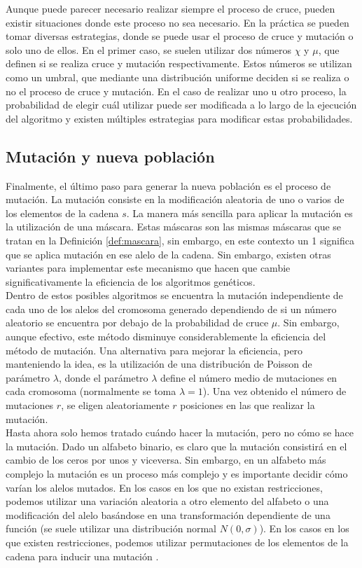 Aunque puede parecer necesario realizar siempre el proceso de cruce, pueden existir situaciones donde este proceso no sea necesario. En la práctica se pueden tomar diversas estrategias, donde se puede usar el proceso de cruce y mutación o solo uno de ellos. En el primer caso, se suelen utilizar dos números $\chi$ y $\mu$, que definen si se realiza cruce y mutación respectivamente. Estos números se utilizan como un umbral, que mediante una distribución uniforme deciden si se realiza o no el proceso de cruce y mutación. En el caso de realizar uno u otro proceso, la probabilidad de elegir cuál utilizar puede ser modificada a lo largo de la ejecución del algoritmo y existen múltiples estrategias para modificar estas probabilidades.
\subsection{Mutación y nueva población}
Finalmente, el último paso para generar la nueva población es el proceso de mutación. La mutación consiste en la modificación aleatoria de uno o varios de los elementos de la cadena $s$. La manera más sencilla para aplicar la mutación es la utilización de una máscara. Estas máscaras son las mismas máscaras que se tratan en la Definición \ref{def:mascara}, sin embargo, en este contexto un 1 significa que se aplica mutación en ese alelo de la cadena. Sin embargo, existen otras variantes para implementar este mecanismo que hacen que cambie significativamente la eficiencia de los algoritmos genéticos.\\

Dentro de estos posibles algoritmos se encuentra la mutación independiente de cada uno de los alelos del cromosoma generado dependiendo de si un número aleatorio se encuentra por debajo de la probabilidad de cruce $\mu$. Sin embargo, aunque efectivo, este método disminuye considerablemente la eficiencia del método de mutación. Una alternativa para mejorar la eficiencia, pero manteniendo la idea, es la utilización de una distribución de Poisson de parámetro $\lambda$, donde el parámetro $\lambda$ define el número medio de mutaciones en cada cromosoma (normalmente se toma $\lambda=1$). Una vez obtenido el número de mutaciones $r$, se eligen aleatoriamente $r$ posiciones en las que realizar la mutación.\\

Hasta ahora solo hemos tratado cuándo hacer la mutación, pero no cómo se hace la mutación. Dado un alfabeto binario, es claro que la mutación consistirá en el cambio de los ceros por unos y viceversa. Sin embargo, en un alfabeto más complejo la mutación es un proceso más complejo y es importante decidir cómo varían los alelos mutados. En los casos en los que no existan restricciones, podemos utilizar una variación aleatoria a otro elemento del alfabeto o una modificación del alelo basándose en una transformación dependiente de una función (se suele utilizar una distribución normal $N(0,\sigma)$). En los casos en los que existen restricciones, podemos utilizar permutaciones de los elementos de la cadena para inducir una mutación \cite{eiben-2003}.\\

